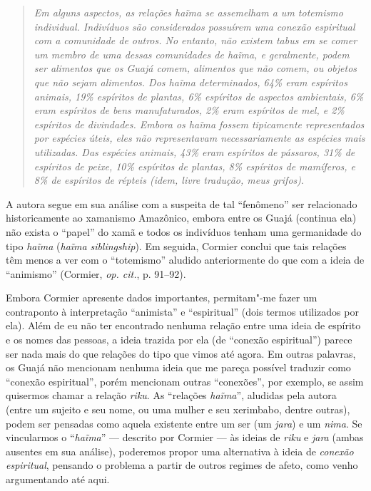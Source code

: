 \begin{quote}
\emph{Em alguns aspectos, as relações \emph{haĩma} se assemelham a um
totemismo individual. Indivíduos são considerados possuírem uma conexão
espiritual com a comunidade de outros. No entanto, não existem tabus em
se comer um membro de uma dessas comunidades de \emph{haĩma}, e
geralmente, podem ser alimentos que os Guajá comem, alimentos que não
comem, ou objetos que não sejam alimentos. Dos \emph{haĩma}
determinados, 64\% eram espíritos animais, 19\% espíritos de plantas,
6\% espíritos de aspectos ambientais, 6\% eram espíritos de bens
manufaturados, 2\% eram espíritos de mel, e 2\% espíritos de divindades.
Embora os \emph{haĩma} fossem tipicamente representados por espécies
úteis, eles não representavam necessariamente as espécies mais
utilizadas. Das espécies animais, 43\% eram espíritos de pássaros, 31\%
de espíritos de peixe, 10\% espíritos de plantas, 8\% espíritos de
mamíferos, e 8\% de espíritos de répteis (\emph{idem}, livre tradução, meus
grifos)}.
\end{quote}

A autora segue em sua análise com a suspeita de tal ``fenômeno'' ser
relacionado historicamente ao xamanismo Amazônico, embora entre os Guajá
(continua ela) não exista o ``papel'' do xamã e todos os indivíduos tenham
uma germanidade do tipo \emph{haĩma} (\emph{haĩma} \emph{siblingship}).
Em seguida, Cormier conclui que tais relações têm menos a ver com o
``totemismo'' aludido anteriormente do que com a ideia de ``animismo''
(Cormier, \emph{op. cit.}, p. 91--92).

Embora Cormier apresente dados importantes, permitam"-me fazer um
contraponto à interpretação ``animista'' e ``espiritual'' (dois termos
utilizados por ela). Além de eu não ter encontrado nenhuma relação entre
uma ideia de espírito e os nomes das pessoas, a ideia trazida por ela
(de ``conexão espiritual'') parece ser nada mais do que relações do tipo
que vimos até agora. Em outras palavras, os Guajá não mencionam nenhuma
ideia que me pareça possível traduzir como ``conexão espiritual'', porém
mencionam outras ``conexões'', por exemplo, se assim quisermos chamar a
relação \emph{riku}. As ``relações \emph{haĩma}'', aludidas pela autora
(entre um sujeito e seu nome, ou uma mulher e seu xerimbabo, dentre
outras), podem ser pensadas como aquela existente entre um ser (um
\emph{jara}) e um \emph{nima}. Se vincularmos o ``\emph{haĩma}'' ---
descrito por Cormier --- às ideias de \emph{riku} e \emph{jara} (ambas
ausentes em sua análise), poderemos propor uma alternativa à ideia de
\emph{conexão espiritual}, pensando o problema a partir de outros
regimes de afeto, como venho argumentando até aqui.


